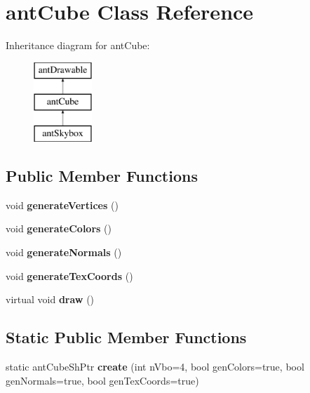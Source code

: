\hypertarget{classant_cube}{\section{ant\+Cube Class Reference}
\label{classant_cube}
}
Inheritance diagram for ant\+Cube\+:\begin{figure}[H]
\begin{center}
\leavevmode
\includegraphics[height=3.000000cm]{classant_cube}
\end{center}
\end{figure}
\subsection*{Public Member Functions}
\begin{DoxyCompactItemize}
\item 
\hypertarget{classant_cube_a5d75beb683c2a6a654e040904c4096ac}{void {\bfseries generate\+Vertices} ()}\label{classant_cube_a5d75beb683c2a6a654e040904c4096ac}

\item 
\hypertarget{classant_cube_a5c962b1138474cfc40e05f2b4adab56e}{void {\bfseries generate\+Colors} ()}\label{classant_cube_a5c962b1138474cfc40e05f2b4adab56e}

\item 
\hypertarget{classant_cube_a284421916f0f30b8193aa23a7ad91734}{void {\bfseries generate\+Normals} ()}\label{classant_cube_a284421916f0f30b8193aa23a7ad91734}

\item 
\hypertarget{classant_cube_af838f52d1a949d1025ebf22f68717317}{void {\bfseries generate\+Tex\+Coords} ()}\label{classant_cube_af838f52d1a949d1025ebf22f68717317}

\item 
\hypertarget{classant_cube_a99eb2bdfb1895f984c7731c1e43aa767}{virtual void {\bfseries draw} ()}\label{classant_cube_a99eb2bdfb1895f984c7731c1e43aa767}

\end{DoxyCompactItemize}
\subsection*{Static Public Member Functions}
\begin{DoxyCompactItemize}
\item 
\hypertarget{classant_cube_a689b791b7ab0f1cd1de664e60fd3e393}{static ant\+Cube\+Sh\+Ptr {\bfseries create} (int n\+Vbo=4, bool gen\+Colors=true, bool gen\+Normals=true, bool gen\+Tex\+Coords=true)}\label{classant_cube_a689b791b7ab0f1cd1de664e60fd3e393}

\end{DoxyCompactItemize}
